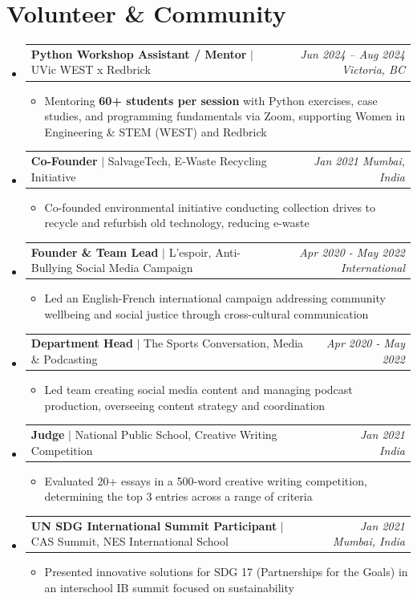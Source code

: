 \documentclass[10pt,letterpaper]{article}
\makeatletter
\newcommand{\resumeSubheading}[4]{
  \vspace{5pt}
  \item[]
    \begin{tabular*}{0.99\textwidth}[t]{l@{\extracolsep{\fill}}r}
      \textbf{\small #1} \textcolor{midgray}{$|$ \small #2} & \textcolor{midgray}{\textit{\small #3 \enspace #4}} \\
    \end{tabular*}
  \vspace{-2pt}
}
\newcommand{\resumeItem}[1]{
  \item {\small #1}
}
\makeatother
\begin{document}
\section{Volunteer \& Community}
\begin{itemize}[leftmargin=0in, label={}]

  \resumeSubheading
    {Python Workshop Assistant / Mentor}{UVic WEST x Redbrick}
    {Jun 2024 -- Aug 2024}{Victoria, BC}
  \begin{itemize}
    \resumeItem{Mentoring \textbf{60+ students per session} with Python exercises, case studies, and programming fundamentals via Zoom, supporting Women in Engineering \& STEM (WEST) and Redbrick}
  \end{itemize}

  \resumeSubheading
    {Co-Founder}{SalvageTech, E-Waste Recycling Initiative}
    {Jan 2021}{Mumbai, India}
  \begin{itemize}
    \resumeItem{Co-founded environmental initiative conducting collection drives to recycle and refurbish old technology, reducing e-waste}
  \end{itemize}

  \resumeSubheading
    {Founder \& Team Lead}{L'espoir, Anti-Bullying Social Media Campaign}
    {Apr 2020 - May 2022}{International}
  \begin{itemize}
    \resumeItem{Led an English-French international campaign addressing community wellbeing and social justice through cross-cultural communication}
  \end{itemize}

  \resumeSubheading
    {Department Head}{The Sports Conversation, Media \& Podcasting}
    {Apr 2020 - May 2022}{}
  \begin{itemize}
    \resumeItem{Led team creating social media content and managing podcast production, overseeing content strategy and coordination}
  \end{itemize}

  \resumeSubheading
    {Judge}{National Public School, Creative Writing Competition}
    {Jan 2021}{India}
  \begin{itemize}
    \resumeItem{Evaluated 20+ essays in a 500-word creative writing competition, determining the top 3 entries across a range of criteria}
  \end{itemize}

  \resumeSubheading
    {UN SDG International Summit Participant}{CAS Summit, NES International School}
    {Jan 2021}{Mumbai, India}
  \begin{itemize}
    \resumeItem{Presented innovative solutions for SDG 17 (Partnerships for the Goals) in an interschool IB summit focused on sustainability}
  \end{itemize}

\end{itemize}
\end{document}
